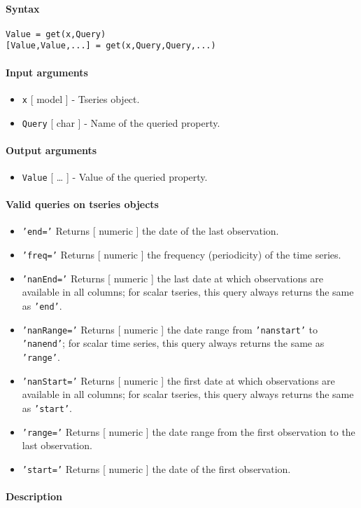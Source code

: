


	\paragraph{Syntax}

\begin{verbatim}
Value = get(x,Query)
[Value,Value,...] = get(x,Query,Query,...)
\end{verbatim}

\paragraph{Input arguments}

\begin{itemize}
\item
  \texttt{x} {[} model {]} - Tseries object.
\item
  \texttt{Query} {[} char {]} - Name of the queried property.
\end{itemize}

\paragraph{Output arguments}

\begin{itemize}
\itemsep1pt\parskip0pt
\item
  \texttt{Value} {[} \ldots{} {]} - Value of the queried property.
\end{itemize}

\paragraph{Valid queries on tseries
objects}

\begin{itemize}
\item
  \texttt{'end='} Returns {[} numeric {]} the date of the last
  observation.
\item
  \texttt{'freq='} Returns {[} numeric {]} the frequency (periodicity)
  of the time series.
\item
  \texttt{'nanEnd='} Returns {[} numeric {]} the last date at which
  observations are available in all columns; for scalar tseries, this
  query always returns the same as \texttt{'end'}.
\item
  \texttt{'nanRange='} Returns {[} numeric {]} the date range from
  \texttt{'nanstart'} to \texttt{'nanend'}; for scalar time series, this
  query always returns the same as \texttt{'range'}.
\item
  \texttt{'nanStart='} Returns {[} numeric {]} the first date at which
  observations are available in all columns; for scalar tseries, this
  query always returns the same as \texttt{'start'}.
\item
  \texttt{'range='} Returns {[} numeric {]} the date range from the
  first observation to the last observation.
\item
  \texttt{'start='} Returns {[} numeric {]} the date of the first
  observation.
\end{itemize}

\paragraph{Description}


